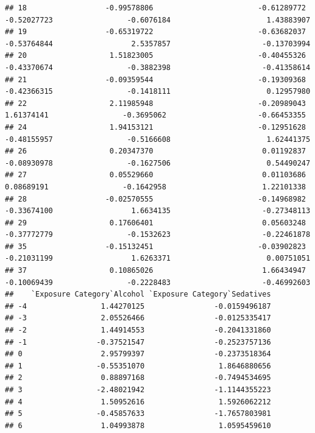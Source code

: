 \documentclass[
]{article}
\begin{document}
\begin{verbatim}
## 18                  -0.99578806                        -0.61289772                   -0.52027723                 -0.6076184                      1.43883907
## 19                  -0.65319722                        -0.63682037                   -0.53764844                  2.5357857                     -0.13703994
## 20                   1.51823005                        -0.40455326                   -0.43370674                 -0.3882398                     -0.41358614
## 21                  -0.09359544                        -0.19309368                   -0.42366315                 -0.1418111                      0.12957980
## 22                   2.11985948                        -0.20989043                    1.61374141                 -0.3695062                     -0.66453355
## 24                   1.94153121                        -0.12951628                   -0.48155957                 -0.5166608                      1.62441375
## 26                   0.20347370                         0.01192837                   -0.08930978                 -0.1627506                      0.54490247
## 27                   0.05529660                         0.01103686                    0.08689191                 -0.1642958                      1.22101338
## 28                  -0.02570555                        -0.14968982                   -0.33674100                  1.6634135                     -0.27348113
## 29                   0.17606401                         0.05603248                   -0.37772779                 -0.1532623                     -0.22461878
## 35                  -0.15132451                        -0.03902823                   -0.21031199                  1.6263371                      0.00751051
## 37                   0.10865026                         1.66434947                   -0.10069439                 -0.2228483                     -0.46992603
##    `Exposure Category`Alcohol `Exposure Category`Sedatives
## -4                 1.44270125                -0.0159496187
## -3                 2.05526466                -0.0125335417
## -2                 1.44914553                -0.2041331860
## -1                -0.37521547                -0.2523757136
## 0                  2.95799397                -0.2373518364
## 1                 -0.55351070                 1.8646880656
## 2                  0.88897168                -0.7494534695
## 3                 -2.48021942                -1.1144355223
## 4                  1.50952616                 1.5926062212
## 5                 -0.45857633                -1.7657803981
## 6                  1.04993878                 1.0595459610

\end{verbatim}
\end{document}
